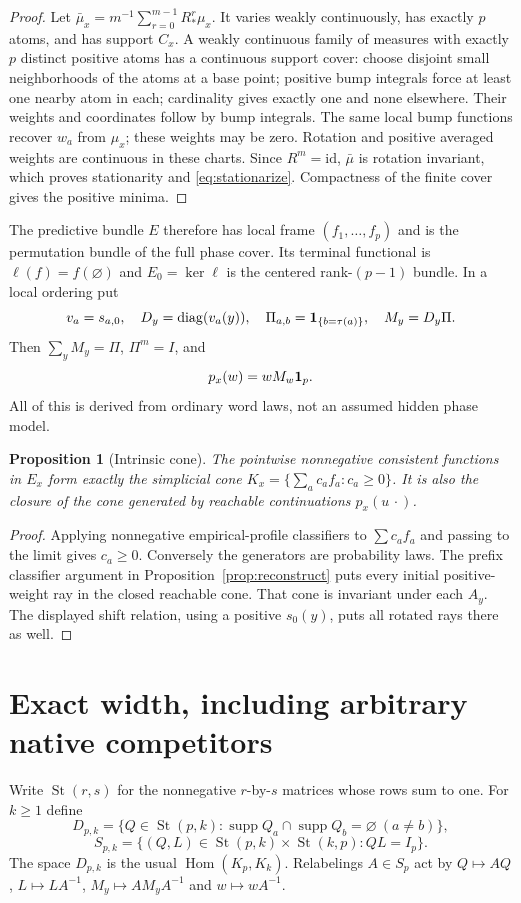 \documentclass[11pt]{article}
\newtheorem{proposition}[theorem]{Proposition}
\theoremstyle{remark}\newtheorem{remark}[theorem]{Remark}
\newcommand{\supp}{\operatorname{supp}}\newcommand{\St}{\operatorname{St}}
\newcommand{\Hom}{\operatorname{Hom}}\newcommand{\eps}{\varepsilon}
\begin{document}
\begin{proof}
Let $\bar\mu_x=m^{-1}\sum_{r=0}^{m-1}R_*^r\mu_x$. It varies weakly continuously, has exactly $p$ atoms, and has support $C_x$. A weakly continuous family of measures with exactly $p$ distinct positive atoms has a continuous support cover: choose disjoint small neighborhoods of the atoms at a base point; positive bump integrals force at least one nearby atom in each; cardinality gives exactly one and none elsewhere. Their weights and coordinates follow by bump integrals. The same local bump functions recover $w_a$ from $\mu_x$; these weights may be zero. Rotation and positive averaged weights are continuous in these charts. Since $R^m=\mathrm{id}$, $\bar\mu$ is rotation invariant, which proves stationarity and \eqref{eq:stationarize}. Compactness of the finite cover gives the positive minima.
\end{proof}

The predictive bundle $E$ therefore has local frame $(f_1,\ldots,f_p)$ and is the permutation bundle of the full phase cover. Its terminal functional is $\ell(f)=f(\varnothing)$ and $E_0=\ker\ell$ is the centered rank-$(p-1)$ bundle. In a local ordering put
\[
v_a=s_{a,0},\quad D_y=\operatorname{diag}(v_a(y)),\quad
\Pi_{a,b}=\mathbf1_{\{b=\tau(a)\}},\quad M_y=D_y\Pi.
\]
Then $\sum_yM_y=\Pi$, $\Pi^m=I$, and
\[
p_x(w)=wM_w\mathbf1_p.
\]
All of this is derived from ordinary word laws, not an assumed hidden phase model.

\begin{proposition}[Intrinsic cone]\label{prop:cone}
The pointwise nonnegative consistent functions in $E_x$ form exactly the simplicial cone $K_x=\{\sum_a c_af_a:c_a\geq0\}$. It is also the closure of the cone generated by reachable continuations $p_x(u\,\cdot)$.
\end{proposition}
\begin{proof}
Applying nonnegative empirical-profile classifiers to $\sum c_af_a$ and passing to the limit gives $c_a\geq0$. Conversely the generators are probability laws. The prefix classifier argument in Proposition~\ref{prop:reconstruct} puts every initial positive-weight ray in the closed reachable cone. That cone is invariant under each $A_y$. The displayed shift relation, using a positive $s_0(y)$, puts all rotated rays there as well.
\end{proof}

\section{Exact width, including arbitrary native competitors}
Write $\St(r,s)$ for the nonnegative $r$-by-$s$ matrices whose rows sum to one. For $k\geq1$ define
\[
D_{p,k}=\{Q\in\St(p,k):\supp Q_a\cap\supp Q_b=\varnothing\ (a\ne b)\},
\]
\[
S_{p,k}=\{(Q,L)\in\St(p,k)\times\St(k,p):QL=I_p\}.
\]
The space $D_{p,k}$ is the usual $\Hom(K_p,K_k)$. Relabelings $A\in S_p$ act by $Q\mapsto AQ$, $L\mapsto LA^{-1}$, $M_y\mapsto AM_yA^{-1}$ and $w\mapsto wA^{-1}$.
\end{document}
